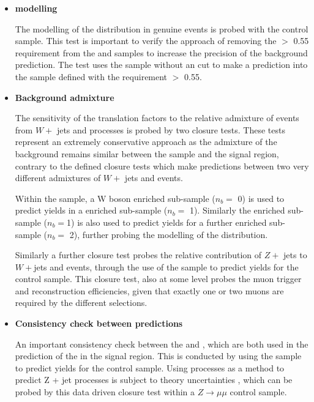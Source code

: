 \begin{itemize}

\item[] \textbf{\alphat modelling}

The modelling of the \alphat distribution in genuine \met events is probed with the \mupjets control sample. This test is important to verify the approach of removing the \alphat $>$ 0.55 requirement from the \mupjets and \dimupjets samples to increase the precision of the background prediction. The test uses the \mupjets sample without an \alphat cut to make a prediction into the \mupjets sample defined with the requirement  \alphat $>$ 0.55.

\item[] \textbf{Background admixture}

The sensitivity of the translation factors to the relative admixture of events from $W +$ jets and \ttbar processes is probed by two closure tests. These tests represent an extremely conservative approach as the admixture of the background remains similar between the \mupjets sample and the signal region, contrary to the defined closure tests which make predictions between two very different admixtures of $W +$ jets and \ttbar events.  

Within the \mupjets sample, a W boson enriched sub-sample ($n_{b} =$ 0) is used to predict yields in a \ttbar enriched sub-sample ($n_{b} =$ 1). Similarly the \ttbar enriched sub-sample ($n_{b} =$1) is also used to predict yields for a further enriched \ttbar sub-sample ($n_{b} =$ 2), further probing the modelling of the \nbreco distribution. 

Similarly a further closure test probes the relative contribution of $Z +$ jets to $W +$jets and \ttbar events, through the use of the \mupjets sample to predict yields for the \dimupjets control sample. This closure test, also at some level probes the muon trigger and reconstruction efficiencies, given that exactly one or two muons are required by the different selections.
 
\item[] \textbf{Consistency check between \zinv predictions}

An important consistency check between the \dimupjets and \gpjets, which are both used in the prediction of the \zinv in the signal region. This is conducted by using the \gpjets sample to predict yields for the \dimupjets control sample. Using \gpjets processes as a method to predict Z + jet processes is subject to theory uncertainties \cite{CMS-PAS-SUS-08-002}, which can be probed by this data driven closure test within a $Z \rightarrow \mu\mu$ control sample. 


\end{itemize}
